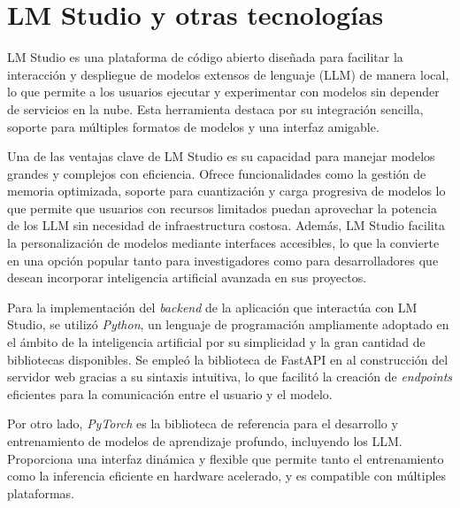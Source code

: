 \section{LM Studio y otras tecnologías}
LM Studio \cite{lmstudio} es una plataforma de código abierto diseñada para facilitar la interacción
y despliegue de modelos extensos de lenguaje (LLM) de manera local,
lo que permite a los usuarios ejecutar y experimentar con modelos sin depender de servicios en la nube.
Esta herramienta destaca por su integración sencilla, soporte para múltiples formatos de modelos y una interfaz amigable.

Una de las ventajas clave de LM Studio es su capacidad para manejar modelos grandes y complejos con eficiencia.
Ofrece funcionalidades como la gestión de memoria optimizada,
soporte para cuantización y carga progresiva de modelos
lo que permite que usuarios con recursos limitados puedan aprovechar la potencia de los LLM
sin necesidad de infraestructura costosa.
Además, LM Studio facilita la personalización de modelos mediante interfaces accesibles,
lo que la convierte en una opción popular tanto para investigadores como para desarrolladores
que desean incorporar inteligencia artificial avanzada en sus proyectos.

Para la implementación del \textit{backend} de la aplicación que interactúa con LM Studio, se utilizó \textit{Python},
un lenguaje de programación ampliamente adoptado en el ámbito de la inteligencia artificial por su simplicidad
y la gran cantidad de bibliotecas disponibles.
Se empleó la biblioteca de FastAPI \cite{fastapi} en al construcción del servidor web gracias a su sintaxis intuitiva,
lo que facilitó la creación de \textit{endpoints} eficientes para la comunicación entre el usuario y el modelo.

Por otro lado, \textit{PyTorch} \cite{pytorch} es la biblioteca de referencia para el desarrollo 
y entrenamiento de modelos de aprendizaje profundo, incluyendo los LLM.
Proporciona una interfaz dinámica y flexible que permite tanto el entrenamiento
como la inferencia eficiente en hardware acelerado, y es compatible con múltiples plataformas.